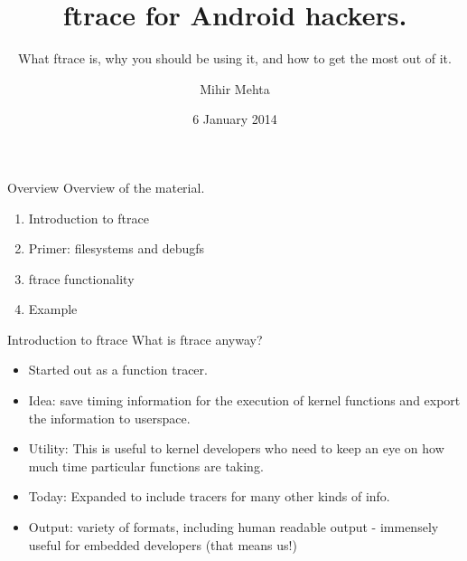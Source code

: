\documentclass{beamer}
\title{ftrace for Android hackers.}
\subtitle{What ftrace is, why you should be using it, and how to get
  the most out of it.}
\author{Mihir Mehta}
\institute{
  Kernel Team\\
  Systems Core Group\\
  SRI Noida \\
  \texttt{mihir.mehta@samsung.com}
}
\date{6 January 2014}
\begin{document}
\begin{frame}[plain]
  \titlepage
\end{frame}

\begin{frame}{Overview}
  Overview of the material.
  \begin{enumerate}
  \item Introduction to ftrace
  \item Primer: filesystems and debugfs
  \item ftrace functionality
  \item Example
  \end{enumerate}
\end{frame}

\begin{frame}{Introduction to ftrace}
  What is ftrace anyway?
  \begin{itemize}
  \item Started out as a function tracer.
  \item Idea: save timing information for the execution of kernel
    functions and export the information to userspace.
  \item Utility: This is useful to kernel developers who need to keep
    an eye on how much time particular functions are taking.
  \item Today: Expanded to include tracers for many other kinds of
    info.
  \item Output: variety of formats, including human readable output -
    immensely useful for embedded developers (that means us!)
  \end{itemize}
\end{frame}
\end{document}

